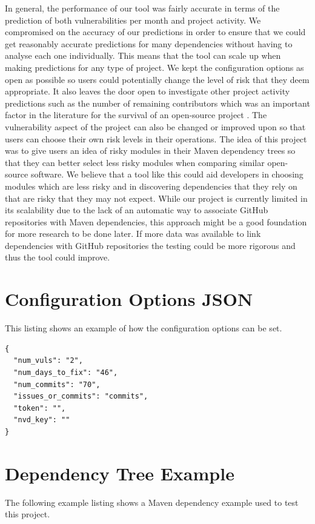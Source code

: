 \documentclass[conference]{IEEEtran}
\begin{document}
{In general, the performance of our tool was fairly accurate in terms of the prediction of both vulnerabilities per month and project activity. We compromised on the accuracy of our predictions in order to ensure that we could get reasonably accurate predictions for many dependencies without having to analyse each one individually. This means that the tool can scale up when making predictions for any type of project. We kept the configuration options as open as possible so users could potentially change the level of risk that they deem appropriate. It also leaves the door open to investigate other project activity predictions such as the number of remaining contributors which was an important factor in the literature for the survival of an open-source project \cite{l_bao_large_2021}. The vulnerability aspect of the project can also be changed or improved upon so that users can choose their own risk levels in their operations. The idea of this project was to give users an idea of risky modules in their Maven dependency trees so that they can better select less risky modules when comparing similar open-source software. We believe that a tool like this could aid developers in choosing modules which are less risky and in discovering dependencies that they rely on that are risky that they may not expect. While our project is currently limited in its scalability due to the lack of an automatic way to associate GitHub repositories with Maven dependencies, this approach might be a good foundation for more research to be done later. If more data was available to link dependencies with GitHub repositories the testing could be more rigorous and thus the tool could improve. 



\appendices

\section{Configuration Options JSON}
This listing shows an example of how the configuration options can be set. 

\begin{lstlisting}[caption=Configuration Options]
{
  "num_vuls": "2",
  "num_days_to_fix": "46",
  "num_commits": "70",
  "issues_or_commits": "commits",
  "token": "",
  "nvd_key": ""
}
\end{lstlisting}



\section{Dependency Tree Example}
The following example listing shows a Maven dependency example used to test this project. 

}
\end{document}
